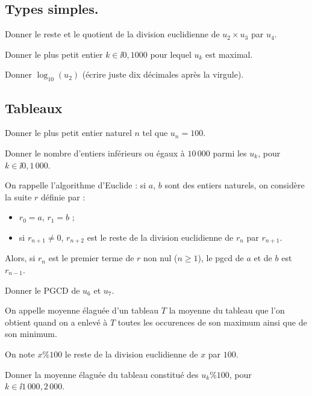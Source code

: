 

\subsection{Types simples.}

\question{} Donner le reste et le quotient de la division euclidienne de $u_2\times u_3$ par $u_4$.

\medskip

\question{} Donner le plus petit entier $k \in \ii{0,1000}$ pour lequel $u_k$ est maximal. 

\medskip 

\question{} Donner $\log_{10} (u_2)$ (écrire juste dix décimales après la virgule).

\subsection{Tableaux}

\question{} Donner le plus petit entier naturel $n$ tel que $u_n = 100$.

\medskip

\question{} Donner le nombre d'entiers inférieurs ou égaux à $10\,000$ parmi les $u_k$, pour $k \in \ii{0,1\,000}$.

\medskip

On rappelle l'algorithme d'Euclide : si $a$, $b$ sont des entiers naturels, on considère la suite $r$ définie par : 
\begin{itemize}
  \item $r_0 = a$, $r_1 = b$ ; 
  \item si $r_{n+1} \neq 0$, $r_{n+2}$ est le reste de la division euclidienne de $r_n$ par $r_{n+1}$.
\end{itemize}
Alors, si $r_n$ est le premier terme de $r$ non nul ($n\geq 1$), le pgcd de $a$ et de $b$ est $r_{n-1}$. 
\medskip

\question{} Donner le PGCD de $u_6$ et $u_7$.

\medskip

On appelle moyenne élaguée d'un tableau $T$ la moyenne du tableau que l'on obtient quand on a enlevé à $T$ toutes les occurences de son maximum ainsi que de son minimum.

On note $x \% 100$ le reste de la division euclidienne de $x$ par $100$.

\medskip

\question{}  Donner la moyenne élaguée du tableau constitué des $u_k \% 100$, pour $k\in \ii{1\,000,2\,000}$.

